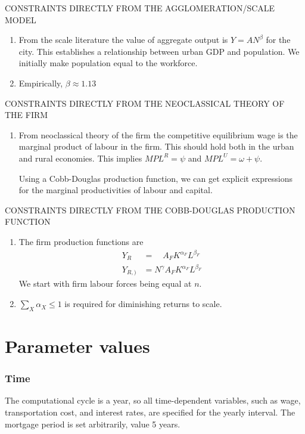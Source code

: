 CONSTRAINTS DIRECTLY FROM THE AGGLOMERATION/SCALE MODEL
\begin{enumerate}
    \item From the scale literature the value of aggregate output is $Y=AN^\beta$ for the city. This establishes a relationship between urban GDP and population. We initially make population equal to the workforce. 

    \item Empirically, $\beta \approx 1.13$
\end{enumerate}

CONSTRAINTS DIRECTLY FROM THE NEOCLASSICAL THEORY OF THE FIRM
\begin{enumerate}
    \item From neoclassical theory of the firm the competitive equilibrium wage is the  marginal product of labour in the firm.      This should hold both in the urban and rural economies. This implies       $ MPL^R=\psi$  and $ MPL^U=\omega+\psi $.

    Using a Cobb-Douglas production function, we can get explicit expressions for the marginal productivities of labour and capital. 
\end{enumerate}

CONSTRAINTS DIRECTLY FROM THE COBB-DOUGLAS PRODUCTION FUNCTION
\begin{enumerate}
\item The firm production functions are 
\begin{align}
Y_R  &= \quad  A_FK^{\alpha_F}L^{\beta_F}\\
Y_{R, )} &= N^\gamma A_FK^{\alpha_F}L^{\beta_F}
\end{align}
We start with firm labour forces  being equal at $n$.

\item $\sum_X \alpha_X \le 1$ is required for diminishing returns to scale. 

\end{enumerate}


\section{Parameter values}\label{sec-param-values}

\subsubsection{Time}
 The computational cycle is a year, so all time-dependent variables, such as wage, transportation cost, and interest rates, are specified for the yearly interval. The mortgage period is set arbitrarily, value 5 years. 

